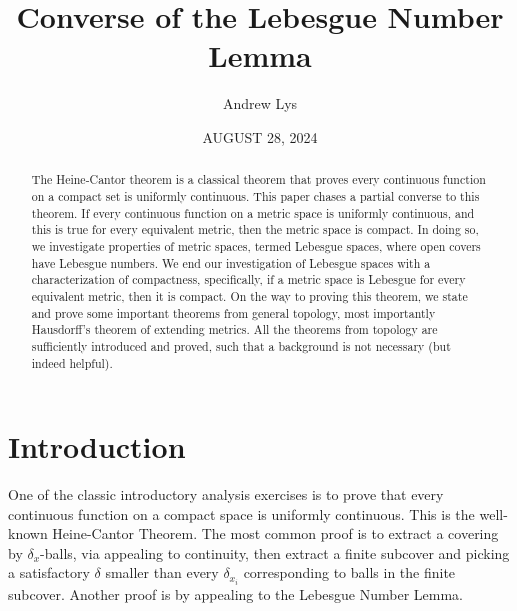 \documentclass[openany, amssymb, psamsfonts]{amsart}
\title{Converse of the Lebesgue Number Lemma}
\author{Andrew Lys}
\date{AUGUST 28, 2024}
\theoremstyle{definition}
\numberwithin{equation}{section}
\begin{document}
\begin{abstract}

The Heine-Cantor theorem is a classical theorem that proves every continuous function on a compact set is uniformly continuous. This paper chases a partial converse to this theorem. If every continuous function on a metric space is uniformly continuous, and this is true for every equivalent metric, then the metric space is compact. In doing so, we investigate properties of metric spaces, termed Lebesgue spaces, where open covers have Lebesgue numbers. We end our investigation of Lebesgue spaces with a characterization of compactness, specifically, if a metric space is Lebesgue for every equivalent metric, then it is compact. On the way to proving this theorem, we state and prove some important theorems from general topology, most importantly Hausdorff's theorem of extending metrics. All the theorems from topology are sufficiently introduced and proved, such that a background is not necessary (but indeed helpful). 

\end{abstract}

\maketitle

\tableofcontents


\section{Introduction}

One of the classic introductory analysis exercises is to prove that every continuous function on a compact space is uniformly continuous. This is the well-known Heine-Cantor Theorem. The most common proof is to extract a covering by $\delta_x$-balls, via appealing to continuity, then extract a finite subcover and picking a satisfactory $\delta$ smaller than every $\delta_{x_i}$ corresponding to balls in the finite subcover. Another proof is by appealing to the Lebesgue Number Lemma. 
\end{document}
